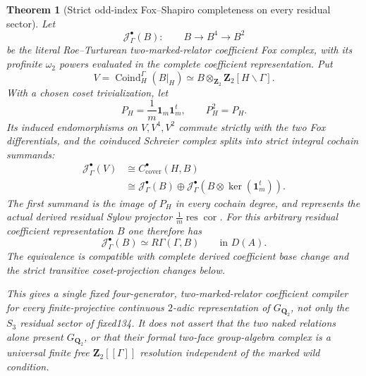 \documentclass[11pt]{article}
\newtheorem{theorem}{Theorem}[section]
\theoremstyle{definition}
\begin{document}
\begin{theorem}[Strict odd-index Fox--Shapiro completeness on every residual sector]
Let
\[
\mathcal J_\Gamma^\bullet(B):
\qquad
B\longrightarrow B^{4}
\longrightarrow B^2
\]
be the \emph{literal
Roe--Turturean
two-marked-relator}
coefficient Fox
complex,
with its
profinite $\omega_2$
powers evaluated
in the complete
coefficient
representation.
Put
\[
V=\operatorname{Coind}_H^\Gamma(B|_H)
\simeq B\otimes_{\mathbf Z_2}
\mathbf Z_2[H\backslash\Gamma].
\]
With a chosen
coset trivialization,
let
\begin{equation}\label{eq:dyadic-f135-odd-coset-projector}
\boxed{\quad
P_H=\frac1m\mathbf1_m\mathbf1_m^t,
\qquad
P_H^2=P_H.
\quad}
\end{equation}
Its induced
endomorphisms on
$V,V^4,V^2$
commute \emph{strictly}
with the two
Fox differentials,
and the
coinduced
Schreier complex
splits into
strict integral
cochain summands:
\begin{equation}\label{eq:dyadic-f135-uniform-coinduced-splitting}
\boxed{
\begin{aligned}
\mathcal J_\Gamma^\bullet(V)
&\cong
C_{\mathrm{cover}}^\bullet(H,B)\\
&\cong
\mathcal J_\Gamma^\bullet(B)
\oplus
\mathcal J_\Gamma^\bullet
\left(B\otimes\ker(\mathbf1_m^t)\right).
\end{aligned}}
\end{equation}
The first summand
is the image of
$P_H$ in every
cochain degree,
and represents the
actual derived
residual Sylow
projector
$\frac1m\operatorname{res}
\operatorname{cor}$.
For this \emph{arbitrary}
residual coefficient
representation
$B$ one therefore has
\begin{equation}\label{eq:dyadic-f135-universal-coefficient-rgamma}
\boxed{\qquad
\mathcal J_\Gamma^\bullet(B)
\simeq
R\Gamma(\Gamma,B)
\qquad
\text{in }D(A).
\qquad}
\end{equation}
The equivalence is
compatible with
complete derived
coefficient base
change and the
strict transitive
coset-projection
changes below.

This gives a
single fixed
\emph{four-generator,
two-marked-relator}
\emph{coefficient
compiler}
for \emph{every}
finite-projective
continuous
$2$-adic
representation
of $G_{\mathbf Q_2}$,
not only the
$S_3$ residual
sector of fixed134.
It does \emph{not}
assert that the
two naked relations
alone present
$G_{\mathbf Q_2}$,
or that their
formal two-face
group-algebra
complex is a
universal
finite free
$\mathbf Z_2[[\Gamma]]$
resolution independent
of the marked
wild condition.
\end{theorem}
\end{document}
